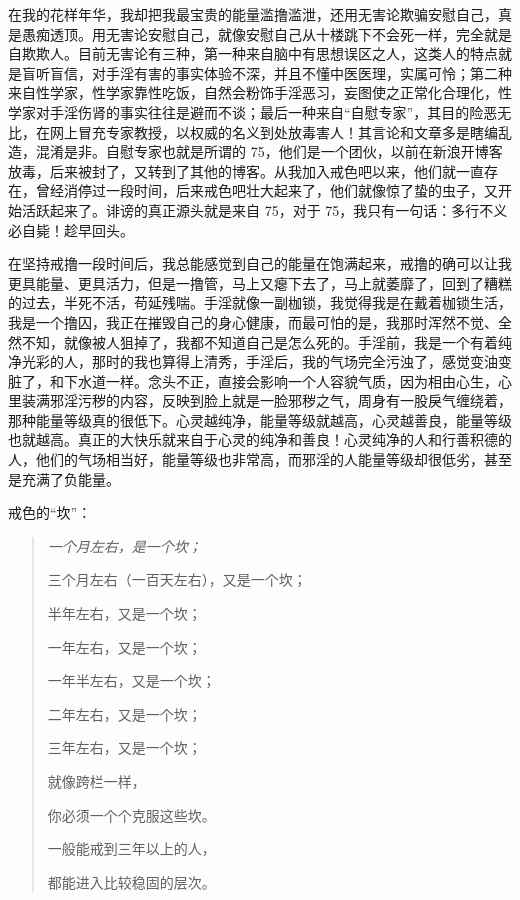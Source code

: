 在我的花样年华，我却把我最宝贵的能量滥撸滥泄，还用无害论欺骗安慰自己，真是愚痴透顶。用无害论安慰自己，就像安慰自己从十楼跳下不会死一样，完全就是自欺欺人。目前无害论有三种，第一种来自脑中有思想误区之人，这类人的特点就是盲听盲信，对手淫有害的事实体验不深，并且不懂中医医理，实属可怜；第二种来自性学家，性学家靠性吃饭，自然会粉饰手淫恶习，妄图使之正常化合理化，性学家对手淫伤肾的事实往往是避而不谈；最后一种来自“自慰专家”，其目的险恶无比，在网上冒充专家教授，以权威的名义到处放毒害人！其言论和文章多是瞎编乱造，混淆是非。自慰专家也就是所谓的 75，他们是一个团伙，以前在新浪开博客放毒，后来被封了，又转到了其他的博客。从我加入戒色吧以来，他们就一直存在，曾经消停过一段时间，后来戒色吧壮大起来了，他们就像惊了蛰的虫子，又开始活跃起来了。诽谤的真正源头就是来自 75，对于 75，我只有一句话：多行不义必自毙！趁早回头。

在坚持戒撸一段时间后，我总能感觉到自己的能量在饱满起来，戒撸的确可以让我更具能量、更具活力，但是一撸管，马上又瘪下去了，马上就萎靡了，回到了糟糕的过去，半死不活，苟延残喘。手淫就像一副枷锁，我觉得我是在戴着枷锁生活，我是一个撸囚，我正在摧毁自己的身心健康，而最可怕的是，我那时浑然不觉、全然不知，就像被人狙掉了，我都不知道自己是怎么死的。手淫前，我是一个有着纯净光彩的人，那时的我也算得上清秀，手淫后，我的气场完全污浊了，感觉变油变脏了，和下水道一样。念头不正，直接会影响一个人容貌气质，因为相由心生，心里装满邪淫污秽的内容，反映到脸上就是一脸邪秽之气，周身有一股戾气缠绕着，那种能量等级真的很低下。心灵越纯净，能量等级就越高，心灵越善良，能量等级也就越高。真正的大快乐就来自于心灵的纯净和善良！心灵纯净的人和行善积德的人，他们的气场相当好，能量等级也非常高，而邪淫的人能量等级却很低劣，甚至是充满了负能量。

戒色的“坎”：

\begin{multicols}{2}
    \begin{quotation}\it
        一个月左右，是一个坎；

        三个月左右（一百天左右），又是一个坎；

        半年左右，又是一个坎；

        一年左右，又是一个坎；

        一年半左右，又是一个坎；

        二年左右，又是一个坎；

        三年左右，又是一个坎；

        就像跨栏一样，

        你必须一个个克服这些坎。

        一般能戒到三年以上的人，

        都能进入比较稳固的层次。
    \end{quotation}
\end{multicols}

